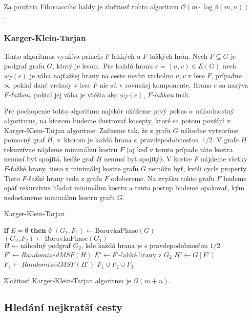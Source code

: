 Za použitia Fibonacciho haldy je zložitosť tohto algoritmu 
$\mathcal{O}(m \cdot \log\beta(m,n))$.

\subsubsection{Karger-Klein-Tarjan}

Tento algoritmus využíva princíp $F$-ľahkých a $F$-ťažkých hrán.
Nech $F\subseteq G$ je podgraf grafu $G$, ktorý je lesom. Pre
každú hranu $e=(u,v) \in E(G)$ nech $w_F(e)$ je váha najťažšej hrany
na ceste medzi vrcholmi $u,v$ v lese $F$, prípadne $\infty$ pokiaľ
dané vrcholy v lese $F$ nie sú v rovnakej komponente. Hrana $e$
sa nazýva {\em $F$-ťažkou}, pokiaľ jej váha je väčšia ako $w_F(e)$, 
{\em $F$-ľahkou} inak.

Pre pochopenie tohto algoritmu najskôr ukážeme prvý pokus o~náhodnostný
algoritmus, na ktorom budeme ilustrovať kocepty, ktoré sa potom 
použíjú v Karger-Klein-Tarjan algoritme. Začneme tak, že z grafu $G$ náhodne
vytvoríme pomocný graf $H$, v~ktorom je každá hrana s~pravdepodobnosťou~$1/2$. 
V grafe $H$ rekurzívne nájdeme minimálnu kostru $F$ (aj keď v tomto prípade
táto kostra nemusí byť spojitá, keďže graf $H$ nemusí byť spojitý).
V kostre $F$ nájdeme všetky $F$-ťažké hrany, tieto v minimálej 
kostre grafu $G$ nemôžu byť, kvôli cycle property. Tieto $F$-ťažké
hrany teda z grafu $F$ odobereme. Na zvyšku tohto grafu $F$ budeme
opäť rekurzívne hľadať minimálnu kostru a tento postup budeme opakovať, kým
nedostaneme minimálnu kostru grafu $G$.

\begin{algorithm}
\caption{Karger-Klein-Tarjan}
\begin{algorithmic}[1]
    \State \textbf{if} {$E = \emptyset$} \textbf{then} \Return $\emptyset$
    \State $(G_1, F_1) \gets \text{BoruvkaPhase}(G)$
	\State $(G_2, F_2) \gets \text{BoruvkaPhase}(G_1)$
	\State $H \gets \text{náhodný podgraf }G_2\text{, kde každá hrana je s pravdepodobnosťou }1/2$
	\State $F' \gets RandomizedMSF(H)$
	\State $E' \gets F'\text{-ľahké hrany z }G_2$
	\State $H' \gets G[E']$
	\State $F_3 \gets RandomizedMSF(H')$
    \State \Return $F_1 \cup F_2 \cup F_3$
\EndFunction
\end{algorithmic}
\end{algorithm}

Zložitosť Karger-Klein-Tarjan algoritmu je $\mathcal{O}(m+n)$.

\subsection{Hledání nejkratší cesty}

